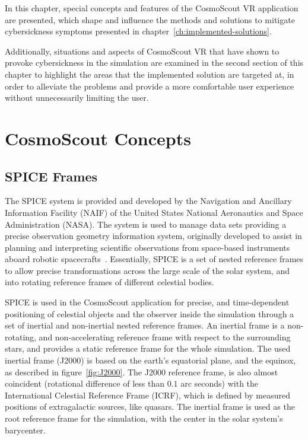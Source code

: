 In this chapter, special concepts and features of the CosmoScout VR application are presented, which shape and
influence the methods and solutions to mitigate cybersickness symptoms presented in
chapter~\ref{ch:implemented-solutions}.

Additionally, situations and aspects of CosmoScout VR that have shown to provoke cybersickness in the simulation are
examined in the second section of this chapter to highlight the areas that the implemented solution are targeted at,
in order to alleviate the problems and provide a more comfortable user experience without unnecessarily limiting the
user.


\section{CosmoScout Concepts}\label{sec:cosmoscout-concepts}

\subsection{SPICE Frames}\label{subsec:spice-frames}

The SPICE system is provided and developed by the Navigation and Ancillary Information Facility (NAIF) of the United
States National Aeronautics and Space Administration (NASA).
The system is used to manage data sets providing a precise observation geometry information system, originally
developed to assist in planning and interpreting scientific observations from space-based
instruments aboard robotic spacecrafts~\cite{NAIFbook, NAIFhomepage}.
Essentially, SPICE is a set of nested reference frames to allow precise transformations across the large scale
of the solar system, and into rotating reference frames of different celestial bodies.

SPICE is used in the CosmoScout application for precise, and time-dependent positioning of celestial objects and the
observer inside the simulation through a set of inertial and non-inertial nested reference frames.
An inertial frame is a non-rotating, and non-accelerating reference frame with respect to the surrounding stars, and
provides a static reference frame for the whole simulation.
The used inertial frame (J2000) is based on the earth's equatorial plane, and the equinox, as described in
figure~\ref{fig:J2000}.
The J2000 reference frame, is also almost coincident (rotational difference of less than $0.1$ arc seconds) with the
International Celestial Reference Frame (ICRF), which is defined by measured positions of extragalactic sources, like
quasars.
The inertial frame is used as the root reference frame for the simulation, with the center in the solar system's
barycenter.

